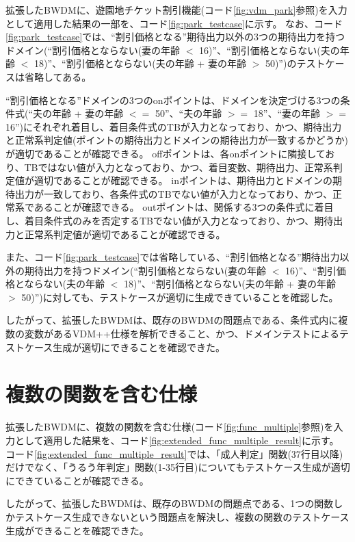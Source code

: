 \documentclass[uplatex, report, a4j, 10pt]{jsbook}
\begin{document}
拡張したBWDMに、遊園地チケット割引機能(コード\ref{fig:vdm_park}参照)を入力として適用した結果の一部を、コード\ref{fig:park_testcase}に示す。
なお、コード\ref{fig:park_testcase}では、``割引価格となる''期待出力以外の3つの期待出力を持つドメイン(``割引価格とならない(妻の年齢 $<$ 16)''、``割引価格とならない(夫の年齢 $<$ 18)''、``割引価格とならない(夫の年齢 + 妻の年齢 $>$ 50)'')のテストケースは省略してある。

``割引価格となる''ドメインの3つのonポイントは、ドメインを決定づける3つの条件式(``夫の年齢 + 妻の年齢 $<=$ 50''、``夫の年齢 $>=$ 18''、``妻の年齢 $>=$ 16'')にそれぞれ着目し、着目条件式のTBが入力となっており、かつ、期待出力と正常系判定値(ポイントの期待出力とドメインの期待出力が一致するかどうか)が適切であることが確認できる。
offポイントは、各onポイントに隣接しており、TBではない値が入力となっており、かつ、着目変数、期待出力、正常系判定値が適切であることが確認できる。
inポイントは、期待出力とドメインの期待出力が一致しており、各条件式のTBでない値が入力となっており、かつ、正常系であることが確認できる。
outポイントは、関係する3つの条件式に着目し、着目条件式のみを否定するTBでない値が入力となっており、かつ、期待出力と正常系判定値が適切であることが確認できる。

また、コード\ref{fig:park_testcase}では省略している、``割引価格となる''期待出力以外の期待出力を持つドメイン(``割引価格とならない(妻の年齢 $<$ 16)''、``割引価格とならない(夫の年齢 $<$ 18)''、``割引価格とならない(夫の年齢 + 妻の年齢 $>$ 50)'')に対しても、テストケースが適切に生成できていることを確認した。

したがって、拡張したBWDMは、既存のBWDMの問題点である、条件式内に複数の変数があるVDM++仕様を解析できること、かつ、ドメインテストによるテストケース生成が適切にできることを確認できた。


\section{複数の関数を含む仕様}\label{sec:tekiyou_multi_func}
拡張したBWDMに、複数の関数を含む仕様(コード\ref{fig:func_multiple}参照)を入力として適用した結果を、コード\ref{fig:extended_func_multiple_result}に示す。
コード\ref{fig:extended_func_multiple_result}では、「成人判定」関数(37行目以降)だけでなく、「うるう年判定」関数(1-35行目)についてもテストケース生成が適切にできていることが確認できる。

したがって、拡張したBWDMは、既存のBWDMの問題点である、1つの関数しかテストケース生成できないという問題点を解決し、複数の関数のテストケース生成ができることを確認できた。
\end{document}
